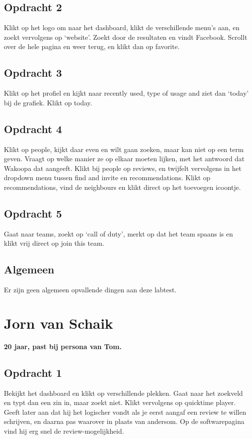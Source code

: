 \subsection{Opdracht 2}
Klikt op het logo om naar het dashboard, klikt de verschillende menu's aan, en zoekt vervolgens op `website'. Zoekt door de resultaten en vindt Facebook. Scrollt over de hele pagina en weer terug, en klikt dan op favorite.

\subsection{Opdracht 3}
Klikt op het profiel en kijkt naar recently used, type of usage and ziet dan `today' bij de grafiek. Klikt op today.

\subsection{Opdracht 4}
Klikt op people, kijkt daar even en wilt gaan zoeken, maar kan niet op een term geven. Vraagt op welke manier ze op elkaar moeten lijken, met het antwoord dat Wakoopa dat aangeeft. Klikt bij people op reviews, en twijfelt vervolgens in het dropdown menu tussen find and invite en recommendations. Klikt op recommendations, vind de neighbours en klikt direct op het toevoegen icoontje.

\subsection{Opdracht 5}
Gaat naar teams, zoekt op `call of duty', merkt op dat het team spaans is en klikt vrij direct op join this team.

\subsection{Algemeen}
Er zijn geen algemeen opvallende dingen aan deze labtest.

\section{Jorn van Schaik}
\textbf{20 jaar, past bij persona van Tom.}

\subsection{Opdracht 1}
Bekijkt het dashboard en klikt op verschillende plekken. Gaat naar het zoekveld en typt dan een zin in, maar zoekt niet. Klikt vervolgens op quicktime player. Geeft later aan dat hij het logischer vondt als je eerst aangaf een review te willen schrijven, en daarna pas waarover in plaats van andersom. Op de softwarepagina vind hij erg snel de review-mogelijkheid.

